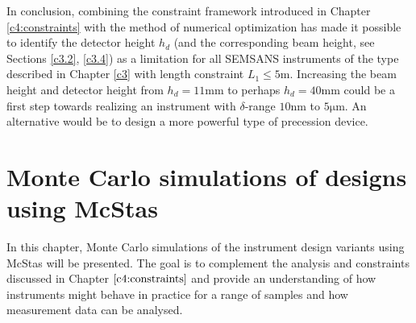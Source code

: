 \documentclass{article}
\begin{document}
In conclusion, combining the constraint framework introduced in Chapter \ref{c4:constraints} with the method of numerical optimization has made it possible to identify the detector height $h_d$ (and the corresponding beam height, see Sections \ref{c3.2}, \ref{c3.4}) as a limitation for all SEMSANS instruments of the type described in Chapter \ref{c3} with length constraint $L_1 \leq 5 \unit\meter$. Increasing the beam height and detector height from $h_d = 11\unit{\milli\meter}$ to perhaps $h_d = 40\unit{\milli\meter}$ could be a first step towards realizing an instrument with $\delta$-range $10 \unit{\nano\meter}$ to $5 \unit{\micro\meter}$. An alternative would be to design a more powerful type of precession device.






\newpage
\section{Monte Carlo simulations of designs using McStas}
\label{c6:monte-carlo}
In this chapter, Monte Carlo simulations of the instrument design variants using McStas \cite{willendrup2020} will be presented. The goal is to complement the analysis and constraints discussed in Chapter $\ref{c4:constraints}$ and provide an understanding of how instruments might behave in practice for a range of samples and how measurement data can be analysed. 
\end{document}
